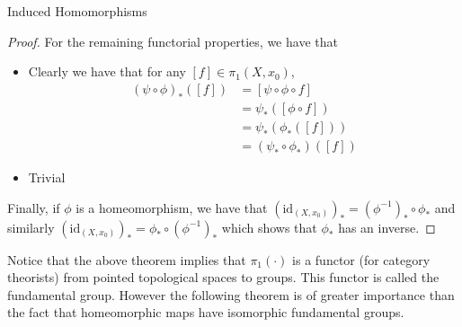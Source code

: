 \documentclass[a4paper]{article}
\begin{document}
\begin{thm}{Induced Homomorphisms}{}
\begin{proof}
For the remaining functorial properties, we have that 
\begin{itemize}
\item Clearly we have that for any $[f]\in\pi_1(X,x_0)$,
\begin{align*}
(\psi\circ\phi)_\ast([f])&=[\psi\circ\phi\circ f]\\
&=\psi_\ast([\phi\circ f])\\
&=\psi_\ast(\phi_\ast([f]))\\
&=(\psi_\ast\circ\phi_\ast)([f])
\end{align*}
\item Trivial
\end{itemize}
Finally, if $\phi$ is a homeomorphism, we have that $(\text{id}_{(X,x_0)})_\ast=(\phi^{-1})_\ast\circ \phi_\ast$ and similarly $(\text{id}_{(X,x_0)})_\ast=\phi_\ast\circ(\phi^{-1})_\ast$ which shows that $\phi_\ast$ has an inverse. 
\end{proof}
\end{thm}

Notice that the above theorem implies that $\pi_1(\cdot)$ is a functor (for category theorists) from pointed topological spaces to groups. This functor is called the fundamental group. However the following theorem is of greater importance than the fact that homeomorphic maps have isomorphic fundamental groups. 
\end{document}
